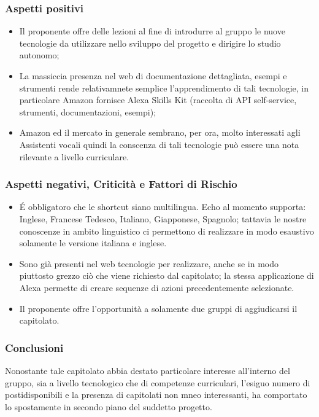 \subsubsection{Aspetti positivi}
\begin{itemize}
    \item Il proponente offre delle lezioni al fine di introdurre al gruppo le nuove tecnologie da utilizzare nello sviluppo del progetto e dirigire lo studio autonomo;
    \item La massiccia presenza nel web di documentazione dettagliata, esempi e strumenti rende relativamnete semplice l'apprendimento di tali tecnologie, in particolare Amazon fornisce Alexa Skills Kit (raccolta di API self-service, strumenti, documentazioni, esempi);
    \item Amazon ed il mercato in generale sembrano, per ora, molto interessati agli Assistenti vocali quindi la conscenza di tali tecnologie può essere una nota rilevante a livello curriculare.
\end{itemize}
\subsubsection{Aspetti negativi, Criticità e Fattori di Rischio}
\begin{itemize}
    \item É obbligatoro che le shortcut siano multilingua. Echo al momento supporta: Inglese, Francese Tedesco, Italiano, Giapponese, Spagnolo; tattavia le nostre conoscenze in ambito linguistico ci permettono di realizzare in modo esaustivo solamente le versione italiana e inglese.
    \item Sono già presenti nel web tecnologie per realizzare, anche se in modo piuttosto grezzo ciò che viene richiesto dal capitolato; la stessa applicazione di Alexa permette di creare sequenze di azioni precedentemente selezionate.
    \item Il proponente offre l'opportunità a solamente due gruppi di aggiudicarsi il capitolato.
\end{itemize}
\subsubsection{Conclusioni}
Nonostante tale capitolato abbia destato particolare interesse all'interno del gruppo, sia a livello tecnologico che di competenze curriculari, l'esiguo numero di postidisponibili e la presenza di capitolati non mneo interessanti, ha comportato lo spostamente in secondo piano del suddetto progetto.

